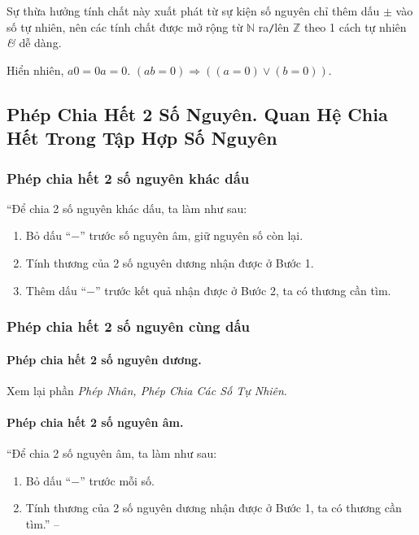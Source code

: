 \documentclass{article}
\numberwithin{equation}{section}
\begin{document}
Sự thừa hưởng tính chất này xuất phát từ sự kiện số nguyên chỉ thêm dấu $\pm$ vào số tự nhiên, nên các tính chất được mở rộng từ $\mathbb{N}$ ra\texttt{/}lên $\mathbb{Z}$ theo 1 cách tự nhiên \textit{\&} dễ dàng.

Hiển nhiên, $a0 = 0a = 0$. $(ab = 0)\Rightarrow((a = 0)\lor(b = 0))$.

\subsection{Phép Chia Hết 2 Số Nguyên. Quan Hệ Chia Hết Trong Tập Hợp Số Nguyên}

\subsubsection{Phép chia hết 2 số nguyên khác dấu}
``Để chia 2 số nguyên khác dấu, ta làm như sau:
\begin{enumerate}
	\item Bỏ dấu ``$-$'' trước số nguyên âm, giữ nguyên số còn lại.
	\item Tính thương của 2 số nguyên dương nhận được ở Bước 1.
	\item Thêm dấu ``$-$'' trước kết quả nhận được ở Bước 2, ta có thương cần tìm.
\end{enumerate}

\subsubsection{Phép chia hết 2 số nguyên cùng dấu}

\paragraph{Phép chia hết 2 số nguyên dương.} Xem lại phần \textit{Phép Nhân, Phép Chia Các Số Tự Nhiên}.

\paragraph{Phép chia hết 2 số nguyên âm.} ``Để chia 2 số nguyên âm, ta làm như sau:
\begin{enumerate}
	\item Bỏ dấu ``$-$'' trước mỗi số.
	\item Tính thương của 2 số nguyên dương nhận được ở Bước 1, ta có thương cần tìm.'' -- \cite[p. 85]{Thai_Anh_Dat_Ha_Loan_Nam_Quang_Toan_6_tap_1}
\end{enumerate}
\end{document}
